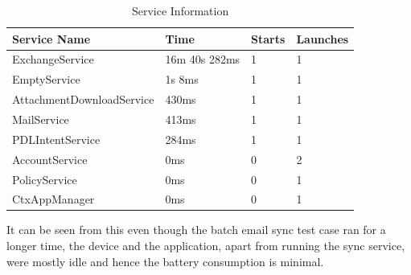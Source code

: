 \begin{table}[!h]
\begin{center}
\caption{Service Information}
\begin{tabular}{|P{7cm}|P{3cm}|P{2cm}|P{2cm}|}
\hline
Service Name                      & Time          & Starts & Launches \\ \hline
ExchangeService                   & 16m 40s 282ms & 1      & 1       \\ \hline
EmptyService                      & 1s 8ms  & 1     & 1       \\ \hline
AttachmentDownloadService         & 430ms     & 1     &1       \\ \hline
MailService                  & 413ms      & 1    & 1       \\ \hline
PDLIntentService                       & 284ms      & 1     & 1       \\ \hline
AccountService                    & 0ms           & 0      & 2       \\ \hline
PolicyService                     & 0ms           & 0      & 1       \\ \hline
CtxAppManager                     & 0ms           & 0      & 1       \\ \hline
\end{tabular}
\end{center}
\end{table}

It can be seen from this even though the batch email sync test case ran for a longer time, the device and the application, apart from running the sync service, were mostly idle and hence the battery consumption is minimal.\\

